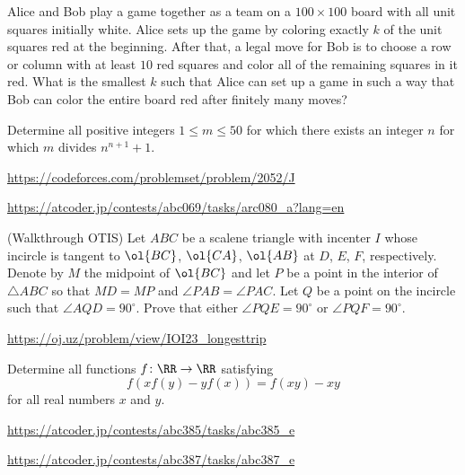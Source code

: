 \documentclass[11pt]{scrartcl}
\begin{document}
\begin{problem}[JBMOSL 2021/C4]
Alice and Bob play a game together as a team on a $100 \times 100$ board with all unit squares initially white. Alice sets up the game by coloring exactly $k$ of the unit squares red at the beginning. After that, a legal move for Bob is to choose a row or column with at least $10$ red squares and color all of the remaining squares in it red. What is the
smallest $k$ such that Alice can set up a game in such a way that Bob can color the entire board red after finitely many moves?
\end{problem}
\begin{problem}
Determine all positive integers $1 \le m \le 50$ for which there exists an integer $n$ for which $m$ divides $n^{n+1}+1$.
\end{problem}
\begin{problem}[CF 2052J]
\url{https://codeforces.com/problemset/problem/2052/J}
\end{problem}
\begin{problem}[AC ARC80A]
\url{https://atcoder.jp/contests/abc069/tasks/arc080_a?lang=en}
\end{problem}
\begin{problem}
  (Walkthrough OTIS)
  Let $ABC$ be a scalene triangle with incenter $I$ whose incircle is
  tangent to $\ol{BC}$, $\ol{CA}$, $\ol{AB}$ at $D$, $E$, $F$,
  respectively.  Denote by $M$ the midpoint of $\ol{BC}$ and
  let $P$ be a point in the interior of $\triangle ABC$
  so that $MD = MP$ and $\angle PAB = \angle PAC$.
  Let $Q$ be a point on the incircle such that $\angle AQD = 90^{\circ}$.
  Prove that either $\angle PQE = 90^{\circ}$ or $\angle PQF = 90^{\circ}$.
\end{problem}
\begin{problem}
\url{https://oj.uz/problem/view/IOI23_longesttrip}
\end{problem}
\begin{problem}
  Determine all functions $f \colon \RR \to \RR$ satisfying
  \[ f\left( xf(y)-yf(x) \right) = f(xy)-xy \]
  for all real numbers $x$ and $y$.

\end{problem}
\begin{problem}[AC ABC385E]
\url{https://atcoder.jp/contests/abc385/tasks/abc385_e}
\end{problem}
\begin{problem}[AC ABC387E]
\url{https://atcoder.jp/contests/abc387/tasks/abc387_e}
\end{problem}
\end{document}
